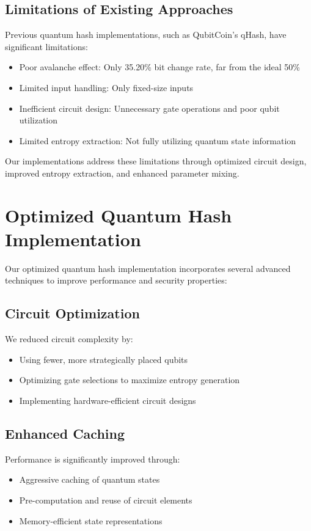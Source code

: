 \documentclass[conference]{IEEEtran}
\begin{document}
\subsection{Limitations of Existing Approaches}
Previous quantum hash implementations, such as QubitCoin's qHash, have significant limitations:

\begin{itemize}
    \item Poor avalanche effect: Only 35.20\% bit change rate, far from the ideal 50\%
    \item Limited input handling: Only fixed-size inputs
    \item Inefficient circuit design: Unnecessary gate operations and poor qubit utilization
    \item Limited entropy extraction: Not fully utilizing quantum state information
\end{itemize}

Our implementations address these limitations through optimized circuit design, improved entropy extraction, and enhanced parameter mixing.

\section{Optimized Quantum Hash Implementation}
Our optimized quantum hash implementation incorporates several advanced techniques to improve performance and security properties:

\subsection{Circuit Optimization}
We reduced circuit complexity by:
\begin{itemize}
    \item Using fewer, more strategically placed qubits
    \item Optimizing gate selections to maximize entropy generation
    \item Implementing hardware-efficient circuit designs
\end{itemize}

\subsection{Enhanced Caching}
Performance is significantly improved through:
\begin{itemize}
    \item Aggressive caching of quantum states
    \item Pre-computation and reuse of circuit elements
    \item Memory-efficient state representations
\end{itemize}
\end{document}
